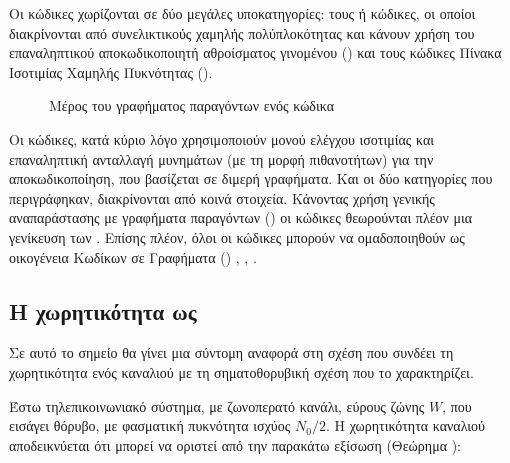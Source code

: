 Οι  κώδικες χωρίζονται σε δύο μεγάλες υποκατηγορίες: τους  ή  κώδικες, οι οποίοι διακρίνονται από συνελικτικούς  χαμηλής πολύπλοκότητας και κάνουν χρήση του επαναληπτικού αποκωδικοποιητή αθροίσματος γινομένου () και τους κώδικες Πίνακα Ισοτιμίας Χαμηλής Πυκνότητας ().

\begin{figure}[h]
\caption{Μέρος του γραφήματος παραγόντων ενός  κώδικα}
\label{fig:LDPC factor graph}
\end{figure}


Οι  κώδικες, κατά κύριο λόγο χρησιμοποιούν  μονού ελέγχου ισοτιμίας και επαναληπτική ανταλλαγή μυνημάτων (με τη μορφή πιθανοτήτων) για την αποκωδικοποίηση, που βασίζεται σε διμερή γραφήματα. Και οι δύο κατηγορίες που περιγράφηκαν, διακρίνονται από κοινά στοιχεία. Kάνοντας χρήση γενικής αναπαράστασης με γραφήματα παραγόντων () οι  κώδικες θεωρούνται πλέον μια γενίκευση των . Επίσης πλέον, όλοι οι  κώδικες μπορούν να ομαδοποιηθούν ως οικογένεια Κωδίκων σε Γραφήματα () \cite{ryan2009channel}, \cite{johnson2009iterative}, \cite{codes2009guest}.

\subsection{Η χωρητικότητα ως }

Σε αυτό το σημείο θα γίνει μια σύντομη αναφορά στη σχέση που συνδέει τη χωρητικότητα ενός καναλιού με τη σηματοθορυβική σχέση  που το χαρακτηρίζει.

Έστω τηλεπικοινωνιακό σύστημα, με ζωνοπερατό κανάλι, εύρους ζώνης $W$, που εισάγει  θόρυβο, με φασματική πυκνότητα ισχύος $N_0/2$. Η χωρητικότητα καναλιού αποδεικνύεται ότι μπορεί να οριστεί από την παρακάτω εξίσωση (Θεώρημα ):

